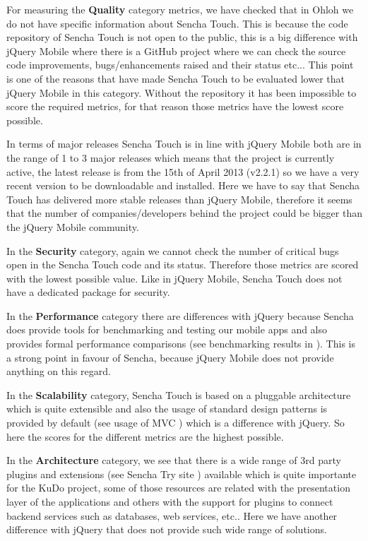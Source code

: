 \documentclass[a4paper,12pt]{book}
\begin{document}
For measuring the \textbf{Quality} category metrics, we have checked that in Ohloh we do not have specific information about Sencha Touch\cite{Ohloh Sencha Touch}. This is because the code repository of Sencha Touch is not open to the public, this is a big difference with jQuery Mobile where there is a GitHub project where we can check the source code improvements, bugs/enhancements raised and their status etc... This point is one of the reasons that have made Sencha Touch to be evaluated lower that jQuery Mobile in this category. Without the repository it has been impossible to score the required metrics, for that reason those metrics have the lowest score possible.

In terms of major releases Sencha Touch is in line with jQuery Mobile both are in the range of 1 to 3 major releases which means that the project is currently active, the latest release is from the 15th of April 2013 (v2.2.1) so we have a very recent version to be downloadable and installed. Here we have to say that Sencha Touch has delivered more stable releases than jQuery Mobile, therefore it seems that the number of companies/developers behind the project could be bigger than the jQuery Mobile community.

In the \textbf{Security} category, again we cannot check the number of critical bugs open in the Sencha Touch code and its status. Therefore those metrics are scored with the lowest possible value. Like in jQuery Mobile, Sencha Touch does not have a dedicated package for security.

In the \textbf{Performance} category there are differences with jQuery because Sencha does provide tools for benchmarking and testing our mobile apps and also provides formal performance comparisons (see benchmarking results in \cite{sencha performance}). This is a strong point in favour of Sencha, because jQuery Mobile does not provide anything on this regard.

In the \textbf{Scalability} category, Sencha Touch is based on a pluggable architecture which is quite extensible and also the usage of standard design patterns is  provided by default (see usage of MVC \cite{sencha MVC}) which is a difference with jQuery. So here the scores for the different metrics are the highest possible.

In the \textbf{Architecture} category, we see that there is a wide range of 3rd party plugins and extensions (see Sencha Try site \cite{sencha Try}) available which is quite importante for the KuDo project, some of those resources are related with the presentation layer of the applications and others with the support for plugins to connect backend services such as databases, web services, etc.. Here we have another difference with jQuery that does not provide such wide range of solutions.
\end{document}

